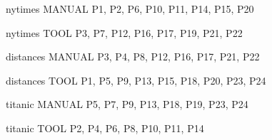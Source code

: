 



nytimes 
MANUAL 
P1, P2, P6, P10, P11, P14, P15, P20

nytimes 
TOOL 
P3, P7, P12, P16, P17, P19, P21,  P22

distances 
MANUAL 
P3, P4, P8, P12, P16, P17,  P21, P22 

distances 
TOOL 
 P1, P5, P9, P13, P15, P18, P20, P23, P24

titanic 
MANUAL 
 P5, P7, P9, P13, P18, P19, P23, P24

titanic 
TOOL 
P2, P4, P6, P8, P10, P11,  P14